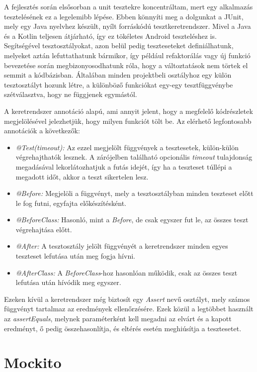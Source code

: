 A fejlesztés során elsősorban a unit tesztekre koncentráltam, mert egy alkalmazás tesztelésének ez a legelemibb lépése. Ebben könnyíti meg a dolgunkat a JUnit, mely egy Java nyelvhez készült, nyílt forráskódú tesztkeretrendszer. Mivel a Java és a Kotlin teljesen átjárható, így ez tökéletes Android teszteléshez is. Segítségével tesztosztályokat, azon belül pedig teszteseteket definiálhatunk, melyeket aztán lefuttathatunk bármikor, így például refaktorálás vagy új funkció bevezetése során megbizonyosodhatunk róla, hogy a változtatások nem törtek el semmit a kódbázisban. Általában minden projektbeli osztályhoz egy külön tesztosztályt hozunk létre, a különböző funkciókat egy-egy tesztfüggvénybe szétválasztva, hogy ne függjenek egymástól.

A keretrendszer annotáció alapú, ami annyit jelent, hogy a megfelelő kódrészletek megjelölésével jelezhetjük, hogy milyen funkciót tölt be. Az elérhető legfontosabb annotációk a következők:
\begin{itemize}
	\item \emph{@Test(timeout):} Az ezzel megjelölt függvények a tesztesetek, külön-külön végrehajthatók lesznek. A zárójelben található opcionális \emph{timeout} tulajdonság megadásával lekorlátozhatjuk a futás idejét, így ha a teszteset túllépi a megadott időt, akkor a teszt sikertelen lesz.
	\item \emph{@Before:} Megjelöli a függvényt, mely a tesztosztályban minden teszteset előtt le fog futni, egyfajta előkészítésként.
	\item \emph{@BeforeClass:} Hasonló, mint a \emph{Before}, de csak egyszer fut le, az összes teszt végrehajtása előtt.
	\item \emph{@After:} A tesztosztály jelölt függvényét a keretrendszer minden egyes teszteset lefutása után meg fogja hívni.
	\item \emph{@AfterClass:} A \emph{BeforeClass}-hoz hasonlóan működik, csak az összes teszt lefutása után hívódik meg egyszer.
\end{itemize}

Ezeken kívül a keretrendszer még biztosít egy \emph{Assert} nevű osztályt, mely számos függvényt tartalmaz az eredmények ellenőrzésére. Ezek közül a legtöbbet használt az \emph{assertEquals}, melynek paraméterként kell megadni az elvárt és a kapott eredményt, ő pedig összehasonlítja, és eltérés esetén meghiúsítja a tesztesetet. \cite{JUnit}

\section{Mockito}

